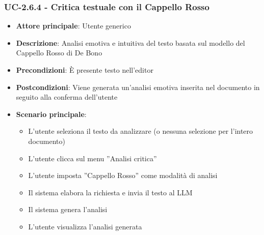 \documentclass[11pt,a4paper]{article}
\begin{document}
\subsubsection{UC-2.6.4 - Critica testuale con il Cappello Rosso}
\begin{itemize}
    \item \textbf{Attore principale}: Utente generico
    \item \textbf{Descrizione}: Analisi emotiva e intuitiva del testo basata sul modello del Cappello Rosso di De Bono
    \item \textbf{Precondizioni}: È presente testo nell’editor
    \item \textbf{Postcondizioni}: Viene generata un’analisi emotiva inserita nel documento in seguito alla conferma dell'utente
    \item \textbf{Scenario principale}:
    \begin{itemize}
        \item L’utente seleziona il testo da analizzare (o nessuna selezione per l'intero documento)
        \item L’utente clicca sul menu ”Analisi critica”
        \item L’utente imposta ”Cappello Rosso” come modalità di analisi
        \item Il sistema elabora la richiesta e invia il testo al LLM
        \item Il sistema genera l'analisi 
        \item L'utente visualizza l'analisi generata
    \end{itemize}
\end{itemize}
\end{document}
